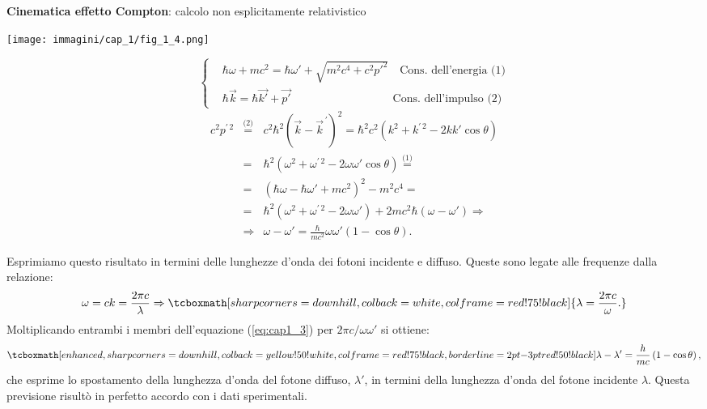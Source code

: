 \begin{center}
\begin{tcolorbox}[toprule=3mm, width=.9\textwidth, colback=white]
\textbf{Cinematica effetto Compton}: calcolo non esplicitamente relativistico\\
	\begin{center}
	\texttt{[image: immagini/cap\_1/fig\_1\_4.png]}
	\end{center}
	\begin{equation}
		\left\{
			\begin{aligned}
			&\hbar \omega +m c^2 = \hbar \omega ' +\sqrt{m^2 c^4 + c^2 p'^2}\quad \textrm{Cons. dell'energia (1)}\\
			& \hbar \vec{k} = \hbar \vec{k'} + \vec{p'}\qquad \qquad \qquad \qquad \quad \textrm{Cons. dell'impulso (2)}
			\end{aligned}
		\right.
	\end{equation}
	\begin{eqnarray}
		c^2 p^{\prime \, 2} &\overset{\textrm{(2)}}{=}& c^2\hbar^2 \left( \vec{k}- {\vec{k}	}^{\, \prime} \right) ^2 = \hbar ^2 c^2 \left(k^2+k^{\prime \, 2}-2kk' \cos \theta \right) \nonumber \\
		&=& \hbar ^2 \left(\omega ^2 + \omega^{\prime \, 2} - 2 \omega \omega ' \cos \theta  \right)\overset{\textrm{(1)}}{=} \nonumber \\
		&=& \left( \hbar \omega - \hbar \omega ' + m c^2 \right) ^2 - m^2 c^4= \nonumber \\
		&=& {\hbar}^2 \left({\omega}^2 + {\omega}^{\prime \, 2} - 2 \omega \omega ' \right) + 2 mc^2 \hbar ( \omega - \omega ' ) \Rightarrow \nonumber \\
		&\Rightarrow & \omega - \omega' =\frac{\hbar}{m c^2} \omega \omega ' \left( 1- \cos \theta \right).
	\end{eqnarray}
\end{tcolorbox}
\end{center}

Esprimiamo questo risultato in termini delle lunghezze d'onda dei fotoni incidente e diffuso. Queste sono legate alle frequenze dalla relazione:
	\begin{equation}
		\omega = c k =\frac{2 \pi c}{\lambda} \Rightarrow \tcboxmath[sharp corners=downhill ,colback=white,colframe=red!75!black]{\lambda =\frac{2 \pi c}{\omega}.}
	\end{equation}
Moltiplicando entrambi i membri dell'equazione (\ref{eq:cap1_3}) per $2 \pi c / \omega \omega '$ si ottiene:
	\begin{equation}
		\tcboxmath[enhanced,sharp corners=downhill ,colback=yellow!50!white,colframe=red!75!black, borderline={2pt}{-3pt}{red!50!black}]{
			\lambda - \lambda ' =\frac{h}{mc}\left( 1-\cos \theta \right),
			}
	\end{equation}
che esprime lo spostamento della lunghezza d'onda del fotone diffuso, $\lambda ' $, in termini della lunghezza d'onda del fotone incidente $\lambda$. Questa previsione risultò in perfetto accordo con i dati sperimentali.\\

